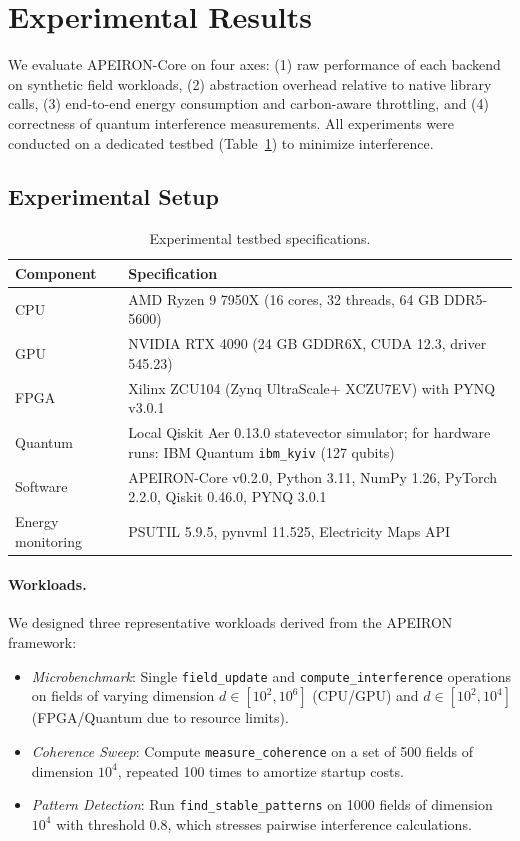 \newpage
\section{Experimental Results}

We evaluate APEIRON-Core on four axes: (1) raw performance of each backend on synthetic field workloads, (2) abstraction overhead relative to native library calls, (3) end-to-end energy consumption and carbon-aware throttling, and (4) correctness of quantum interference measurements. All experiments were conducted on a dedicated testbed (Table~\ref{tab:testbed}) to minimize interference.

\subsection{Experimental Setup}

\begin{table}[htbp]
\centering
\begin{tabular}{ll}
\toprule
Component & Specification \\
\midrule
CPU & AMD Ryzen 9 7950X (16 cores, 32 threads, 64 GB DDR5-5600) \\
GPU & NVIDIA RTX 4090 (24 GB GDDR6X, CUDA 12.3, driver 545.23) \\
FPGA & Xilinx ZCU104 (Zynq UltraScale+ XCZU7EV) with PYNQ v3.0.1 \\
Quantum & Local Qiskit Aer 0.13.0 statevector simulator; for hardware runs: IBM Quantum \texttt{ibm\_kyiv} (127 qubits) \\
Software & APEIRON-Core v0.2.0, Python 3.11, NumPy 1.26, PyTorch 2.2.0, Qiskit 0.46.0, PYNQ 3.0.1 \\
Energy monitoring & PSUTIL 5.9.5, pynvml 11.525, Electricity Maps API \\
\bottomrule
\end{tabular}
\caption{Experimental testbed specifications.}
\label{tab:testbed}
\end{table}

\paragraph{Workloads.}
We designed three representative workloads derived from the APEIRON framework:

\begin{itemize}
    \item \textit{Microbenchmark}: Single \texttt{field\_update} and \texttt{compute\_interference} operations on fields of varying dimension \(d \in [10^2, 10^6]\) (CPU/GPU) and \(d \in [10^2, 10^4]\) (FPGA/Quantum due to resource limits).
    \item \textit{Coherence Sweep}: Compute \texttt{measure\_coherence} on a set of 500 fields of dimension \(10^4\), repeated 100 times to amortize startup costs.
    \item \textit{Pattern Detection}: Run \texttt{find\_stable\_patterns} on 1000 fields of dimension \(10^4\) with threshold 0.8, which stresses pairwise interference calculations.
\end{itemize}

